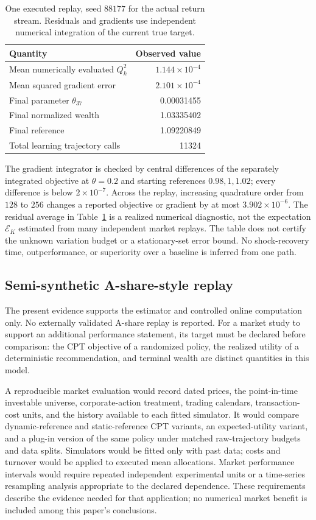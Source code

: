 \documentclass[11pt]{article}
\newcommand{\1}{\mathbf 1}
\theoremstyle{definition}
\begin{document}
\begin{table}[htbp]
\centering\small
\caption{One executed replay, seed $88177$ for the actual return stream. Residuals and gradients use independent numerical integration of the current true target.}\label{tab:replay}
\begin{tabular}{lr}
\toprule Quantity & Observed value\\\midrule
Mean numerically evaluated $Q_k^2$ & $1.144\times10^{-4}$ \\
Mean squared gradient error & $2.101\times10^{-4}$ \\
Final parameter $\theta_{37}$ & 0.00031455 \\
Final normalized wealth & 1.03335402 \\
Final reference & 1.09220849 \\
Total learning trajectory calls & 11324 \\
\bottomrule
\end{tabular}
\end{table}

The gradient integrator is checked by central differences of the separately integrated objective at $\theta=0.2$ and starting references $0.98,1,1.02$; every difference is below $2\times10^{-7}$. Across the replay, increasing quadrature order from $128$ to $256$ changes a reported objective or gradient by at most $3.902\times10^{-6}$. The residual average in Table~\ref{tab:replay} is a realized numerical diagnostic, not the expectation $\mathcal E_K$ estimated from many independent market replays. The table does not certify the unknown variation budget or a stationary-set error bound. No shock-recovery time, outperformance, or superiority over a baseline is inferred from one path.

\subsection{Semi-synthetic A-share-style replay}
The present evidence supports the estimator and controlled online computation only. No externally validated A-share replay is reported. For a market study to support an additional performance statement, its target must be declared before comparison: the CPT objective of a randomized policy, the realized utility of a deterministic recommendation, and terminal wealth are distinct quantities in this model.

A reproducible market evaluation would record dated prices, the point-in-time investable universe, corporate-action treatment, trading calendars, transaction-cost units, and the history available to each fitted simulator. It would compare dynamic-reference and static-reference CPT variants, an expected-utility variant, and a plug-in version of the same policy under matched raw-trajectory budgets and data splits. Simulators would be fitted only with past data; costs and turnover would be applied to executed mean allocations. Market performance intervals would require repeated independent experimental units or a time-series resampling analysis appropriate to the declared dependence. These requirements describe the evidence needed for that application; no numerical market benefit is included among this paper's conclusions.
\end{document}

